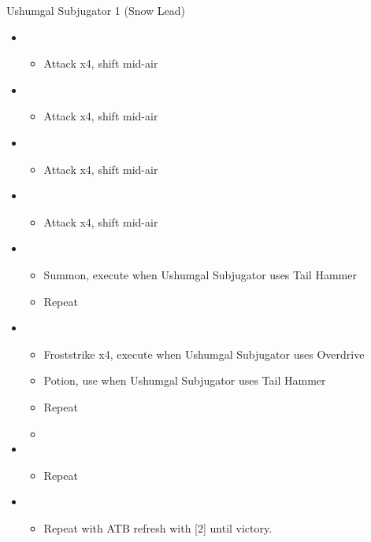 \begin{battle}{Ushumgal Subjugator 1 (Snow Lead)}
\begin{itemize}
    \item \first
    \begin{itemize}
        \item Attack x4, shift mid-air
    \end{itemize}
    \item \second
    \begin{itemize}
        \item Attack x4, shift mid-air
    \end{itemize}
    \item \first
    \begin{itemize}
        \item Attack x4, shift mid-air
    \end{itemize}
    \item \second
    \begin{itemize}
        \item Attack x4, shift mid-air
    \end{itemize}
    \item \first
    \begin{itemize}
        \item Summon, execute when Ushumgal Subjugator uses Tail Hammer
        \item Repeat
     \end{itemize}
    \item \fifth
    \begin{itemize}
        \item Froststrike x4, execute when Ushumgal Subjugator uses Overdrive
        \item Potion, use when Ushumgal Subjugator uses Tail Hammer
        \item Repeat
        \item \stagger
    \end{itemize}
    \item \sixth
    \begin{itemize}
        \item Repeat
    \end{itemize}
    \item \first
    \begin{itemize}
        \item Repeat with ATB refresh with [2] until victory.
    \end{itemize}
\end{itemize}
\end{battle}

